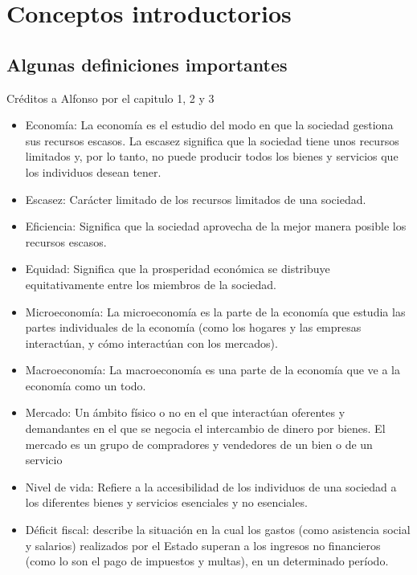 \documentclass{report}
\begin{document}
\tableofcontents

\chapter{Conceptos introductorios}

\section{Algunas definiciones importantes}
{\footnotesize Créditos a Alfonso por el capitulo 1, 2 y 3}
\begin{itemize}
	\item Economía: La economía es el estudio del modo en que la sociedad gestiona sus recursos escasos. La escasez significa que la sociedad tiene unos recursos limitados y, por lo tanto, no puede producir todos los bienes y servicios que los individuos desean tener.

	\item Escasez: Carácter limitado de los recursos limitados de una sociedad.

	\item Eficiencia: Significa que la sociedad aprovecha de la mejor manera posible los recursos escasos.

	\item Equidad: Significa que la prosperidad económica se distribuye equitativamente entre los miembros de la sociedad.

	\item Microeconomía: La microeconomía es la parte de la economía que estudia las partes individuales de la economía (como los hogares y las empresas interactúan, y cómo interactúan con los mercados).

	\item Macroeconomía: La macroeconomía es una parte de la economía que ve a la economía como un todo.

	\item Mercado: Un ámbito físico o no en el que interactúan oferentes y demandantes en el que se negocia el intercambio de dinero por bienes. El mercado es un grupo de compradores y vendedores de un bien o de un servicio

	\item Nivel de vida: Refiere a la accesibilidad de los individuos de una sociedad a los diferentes bienes y servicios esenciales y no esenciales.

	\item Déficit fiscal: describe la situación en la cual los gastos (como asistencia social y salarios) realizados por el Estado superan a los ingresos no financieros (como lo son el pago de impuestos y multas), en un determinado período.


\end{itemize}
\end{document}
